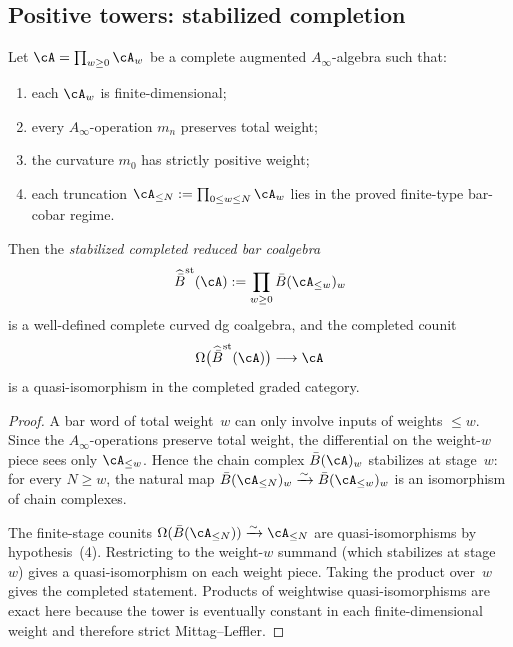 \subsection{Positive towers: stabilized completion}

\begin{theorem}
\label{thm:stabilized-completion-positive}
Let $\cA = \prod_{w \ge 0} \cA_w$ be a complete augmented
$A_\infty$-algebra such that:
\begin{enumerate}
\item each $\cA_w$ is finite-dimensional;
\item every $A_\infty$-operation $m_n$ preserves total weight;
\item the curvature $m_0$ has strictly positive weight;
\item each truncation
 $\cA_{\le N} := \prod_{0 \le w \le N} \cA_w$
 lies in the proved finite-type bar-cobar regime.
\end{enumerate}
Then the \emph{stabilized completed reduced bar coalgebra}
\[
\widehat{\bar B}^{\mathrm{st}}(\cA)
:= \prod_{w \ge 0} \bar B(\cA_{\le w})_w
\]
is a well-defined complete curved dg coalgebra, and the
completed counit
\[
\Omega\bigl(\widehat{\bar B}^{\mathrm{st}}(\cA)\bigr)
\longrightarrow \cA
\]
is a quasi-isomorphism in the completed graded category.
\end{theorem}

\begin{proof}
A bar word of total weight~$w$ can only involve inputs of weights
$\le w$. Since the $A_\infty$-operations preserve total weight,
the differential on the weight-$w$ piece sees only $\cA_{\le w}$.
Hence the chain complex $\bar B(\cA)_w$ stabilizes at stage~$w$:
for every $N \ge w$, the natural map
$\bar B(\cA_{\le N})_w \xrightarrow{\sim} \bar B(\cA_{\le w})_w$
is an isomorphism of chain complexes.

The finite-stage counits
$\Omega(\bar B(\cA_{\le N})) \xrightarrow{\sim} \cA_{\le N}$
are quasi-isomorphisms by hypothesis~(4). Restricting to
the weight-$w$ summand (which stabilizes at stage~$w$)
gives a quasi-isomorphism on each weight piece. Taking the
product over~$w$ gives the completed statement.  Products of
weightwise quasi-isomorphisms are exact here because the tower is
eventually constant in each finite-dimensional weight and therefore
strict Mittag--Leffler.
\end{proof}

